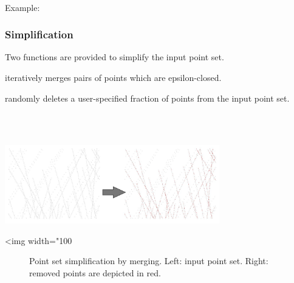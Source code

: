   \\


Example:



\subsubsection{Simplification}

Two functions are provided to simplify the input point set.

 iteratively merges pairs of points which are epsilon-closed.

 randomly deletes a user-specified fraction of points from the input point set.

  \\
  \\

\begin{center}
    \label{Point_set_processing_3-fig-merge_simplification}
    \begin{ccTexOnly}
        \includegraphics[width=0.7\textwidth]{Point_set_processing_3/merge_simplification} %
    \end{ccTexOnly}
    \begin{ccHtmlOnly}
        <img width="100%
    \end{ccHtmlOnly}
    \begin{figure}[h]
        \caption{Point set simplification by merging.
                 Left: input point set.
                 Right: removed points are depicted in red.}
    \end{figure}
\end{center}

